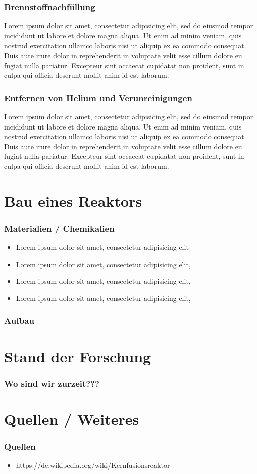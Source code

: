 \documentclass[aspectratio=169]{beamer}
\begin{document}
    \begin{frame}
      \frametitle{Brennstoffnachfüllung}
      Lorem ipsum dolor sit amet, consectetur adipisicing elit, sed do eiusmod tempor incididunt ut labore et dolore magna aliqua. Ut enim ad minim veniam, quis nostrud exercitation ullamco laboris nisi ut aliquip ex ea commodo consequat. Duis aute irure dolor in reprehenderit in voluptate velit esse cillum dolore eu fugiat nulla pariatur. Excepteur sint occaecat cupidatat non proident, sunt in culpa qui officia deserunt mollit anim id est laborum.
    \end{frame}

    \begin{frame}
      \frametitle{Entfernen von Helium und Verunreinigungen}
      Lorem ipsum dolor sit amet, consectetur adipisicing elit, sed do eiusmod tempor incididunt ut labore et dolore magna aliqua. Ut enim ad minim veniam, quis nostrud exercitation ullamco laboris nisi ut aliquip ex ea commodo consequat. Duis aute irure dolor in reprehenderit in voluptate velit esse cillum dolore eu fugiat nulla pariatur. Excepteur sint occaecat cupidatat non proident, sunt in culpa qui officia deserunt mollit anim id est laborum.
    \end{frame}

  \section{Bau eines Reaktors}

    \begin{frame}
      \frametitle{Materialien / Chemikalien}
      \begin{itemize}
        \item Lorem ipsum dolor sit amet, consectetur adipisicing elit
        \item Lorem ipsum dolor sit amet, consectetur adipisicing elit,
        \item Lorem ipsum dolor sit amet, consectetur adipisicing elit,
        \item Lorem ipsum dolor sit amet, consectetur adipisicing elit,
      \end{itemize}
    \end{frame}

    \begin{frame}
      \frametitle{Aufbau}
    \end{frame}

  \section{Stand der Forschung}

  \begin{frame}
    \frametitle{Wo sind wir zurzeit???}
  \end{frame}

  \section{Quellen / Weiteres}

    \begin{frame}
      \frametitle{Quellen}
      \begin{itemize}
        \item https://de.wikipedia.org/wiki/Kernfusionsreaktor
      \end{itemize}
    \end{frame}
\end{document}
